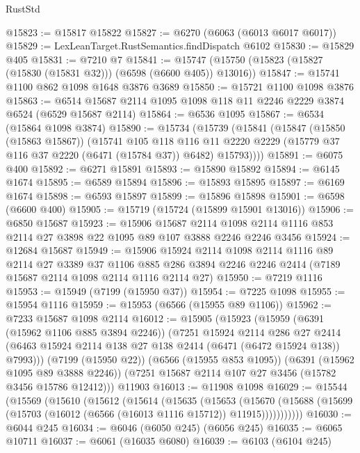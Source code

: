 \begin{lexlean}{RustStd}
\begin{coremodule}
{\begin{coremodule}
{{{{{{{{{{{{{{{{{{{{{{{{{{@15823 := @15817 @15822
@15827 := @6270 (@6063 (@6013 @6017 @6017))
@15829 := LexLeanTarget.RustSemantics.findDispatch @6102
@15830 := @15829 @405
@15831 := @7210 @7
@15841 := @15747 (@15750 (@15823 (@15827 (@15830 (@15831 @32))) (@6598 (@6600 @405)) @13016))
@15847 := @15741 @1100 @862 @1098 @1648 @3876 @3689
@15850 := @15721 @1100 @1098 @3876
@15863 := @6514 @15687 @2114 @1095 @1098 @118 @11 @2246 @2229 @3874 @6524 (@6529 @15687 @2114)
@15864 := @6536 @1095
@15867 := @6534 (@15864 @1098 @3874)
@15890 := @15734
    (@15739
      (@15841
        (@15847
          (@15850 (@15863 @15867))
          (@15741
            @105
            @118
            @116
            @11
            @2220
            @2229
            (@15779 @37 @116 @37 @2220 (@6471 (@15784 @37)) @6482)
            @15793))))
@15891 := @6075 @400
@15892 := @6271 @15891
@15893 := @15890 @15892
@15894 := @6145 @1674
@15895 := @6589 @15894
@15896 := @15893 @15895
@15897 := @6169 @1674
@15898 := @6593 @15897
@15899 := @15896 @15898
@15901 := @6598 (@6600 @400)
@15905 := @15719 (@15724 (@15899 @15901 @13016))
@15906 := @6850 @15687
@15923 := @15906
    @15687
    @2114
    @1098
    @2114
    @1116
    @853
    @2114
    @27
    @3898
    @22
    @1095
    @89
    @107
    @3888
    @2246
    @2246
    @3456
@15924 := @12684 @15687
@15949 := @15906
    @15924
    @2114
    @1098
    @2114
    @1116
    @89
    @2114
    @27
    @3389
    @37
    @1106
    @885
    @286
    @3894
    @2246
    @2246
    @2414
    (@7189 @15687 @2114 @1098 @2114 @1116 @2114 @27)
@15950 := @7219 @1116
@15953 := @15949 (@7199 (@15950 @37))
@15954 := @7225 @1098
@15955 := @15954 @1116
@15959 := @15953 (@6566 (@15955 @89 @1106))
@15962 := @7233 @15687 @1098 @2114
@16012 := @15905
    (@15923
      (@15959
        (@6391 (@15962 @1106 @885 @3894 @2246))
        (@7251
          @15924
          @2114
          @286
          @27
          @2414
          (@6463 @15924 @2114 @138 @27 @138 @2414 (@6471 (@6472 @15924 @138)) @7993)))
      (@7199 (@15950 @22))
      (@6566 (@15955 @853 @1095))
      (@6391 (@15962 @1095 @89 @3888 @2246))
      (@7251 @15687 @2114 @107 @27 @3456 (@15782 @3456 @15786 @12412)))
    @11903
@16013 := @11908 @1098
@16029 := @15544
    (@15569
      (@15610
        (@15612
          (@15614
            (@15635
              (@15653
                (@15670
                  (@15688 (@15699 (@15703 (@16012 (@6566 (@16013 @1116 @15712)) @11915)))))))))))
@16030 := @6044 @245
@16034 := @6046 (@6050 @245) (@6056 @245)
@16035 := @6065 @10711
@16037 := @6061 (@16035 @6080)
@16039 := @6103 (@6104 @245)
}}}}}}}}}}}}}}}}}}}}}}}}}}
\end{coremodule}}
\end{coremodule}
\end{lexlean}
